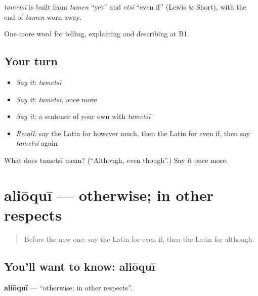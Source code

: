 \begin{cousinweb}
\emph{tametsī} is built from \emph{tamen} \textquotedblleft{}yet\textquotedblright{} and \emph{etsī} \textquotedblleft{}even if\textquotedblright{} (Lewis \& Short), with the end of \emph{tamen} worn away.
\end{cousinweb}

\begin{grammarlens}[title={What you've built}]
One more word for telling, explaining and describing at B1.
\end{grammarlens}

\subsection*{Your turn}
\begin{itemize}
\raggedright
  \item \emph{Say it:} \emph{tametsī}
  \item \emph{Say it:} \emph{tametsī}, once more
  \item \emph{Say it:} a sentence of your own with \emph{tametsī}
  \item \emph{Recall:} say the Latin for however much, then the Latin for even if, then say \emph{tametsī} again
\end{itemize}

\begin{tcolorbox}[breakable,colback=teal!4,colframe=teal!35!black,title={Before you move on}]
What does tametsī mean? (\textquotedblleft{}Although, even though\textquotedblright{}.) Say it once more.
\end{tcolorbox}
\section[aliōquī]{aliōquī — otherwise; in other respects}

\label{lesson:LA-C391-alioqui}



\begin{quote}
Before the new one: say the Latin for even if, then the Latin for although.
\end{quote}

\subsection*{You'll want to know: aliōquī}
\textbf{aliōquī} — \textquotedblleft{}otherwise; in other respects\textquotedblright{}.

